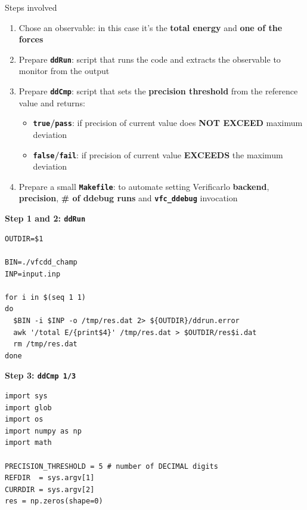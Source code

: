 \documentclass[aspectratio=169]{beamer}
\begin{document}
    \begin{frame}{Steps involved}
      \begin{enumerate}
        \item Chose an observable: in this case it's the \textbf{total energy} and \textbf{one of the forces}
        \item Prepare \textbf{\texttt{ddRun}}: script that runs the code and extracts the observable to monitor from the output
        \item Prepare \textbf{\texttt{ddCmp}}: script that sets the \textbf{precision threshold} from the reference value and returns:
          \begin{itemize}
            \item \textbf{\texttt{true}/\texttt{pass}}: if precision of  current value does \textbf{NOT EXCEED} maximum deviation
            \item \textbf{\texttt{false}/\texttt{fail}}: if precision of  current value \textbf{EXCEEDS} the maximum deviation 
          \end{itemize}
        \item Prepare a small \textbf{\texttt{Makefile}}: to automate setting Verificarlo \textbf{backend}, \textbf{precision}, \textbf{\# of ddebug runs} and \textbf{\texttt{vfc\_ddebug}} invocation
      \end{enumerate}
    \end{frame}

    \begin{frame}[fragile]{\textbf{Step 1 and 2: \texttt{ddRun}}}
      \begin{verbatim}
OUTDIR=$1

BIN=./vfcdd_champ
INP=input.inp

for i in $(seq 1 1)
do
  $BIN -i $INP -o /tmp/res.dat 2> ${OUTDIR}/ddrun.error
  awk '/total E/{print$4}' /tmp/res.dat > $OUTDIR/res$i.dat
  rm /tmp/res.dat
done
      \end{verbatim}
    \end{frame}
    
    \begin{frame}[fragile]{\textbf{Step 3: \texttt{ddCmp 1/3}}}
      \begin{verbatim}
import sys
import glob
import os
import numpy as np
import math

PRECISION_THRESHOLD = 5 # number of DECIMAL digits
REFDIR  = sys.argv[1]
CURRDIR = sys.argv[2]
res = np.zeros(shape=0)
      \end{verbatim}
    \end{frame}
\end{document}
